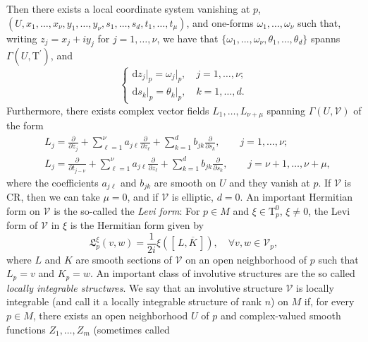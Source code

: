 \documentclass[11pt]{amsart}
\theoremstyle{definition}
\theoremstyle{remark}
\theoremstyle{plain}
\begin{document}
Then
there exists a local coordinate system vanishing at $p$,
$(U, x_1, \dots, x_\nu, y_1, \dots, y_\nu, s_1, \dots, s_d, t_1,
\dots, t_\mu)$, and one-forms
$\omega_1, \dots, \omega_\nu$ such that,
writing $z_j = x_j + iy_j$ for $j =1, \dots, \nu$, we have that
$\{\omega_1, \dots, \omega_\nu, \theta_1, \dots, \theta_d\}$ spanns
$\Gamma(U, \mathrm{T}^\prime)$, and
%
\begin{equation*}
  \begin{cases}
    \mathrm{d}z_j\big|_p = \omega_j \big|_p, \quad j = 1, \dots, \nu;\\
    \mathrm{d}s_k \big|_p = \theta_k\big|_p, \quad k = 1, \dots, d.
  \end{cases}
\end{equation*}
%
Furthermore, there exists complex vector fields
$L_1, \dots, L_{\nu + \mu}$ spanning $\Gamma(U, \mathcal{V})$ of the
form
%
\begin{align*}
  &L_{j} = \frac{\partial}{\partial \bar{z}_j} + \sum_{\ell = 1}^\nu a_{j\ell} \frac{\partial}{ \partial z_\ell} + \sum_{k =1}^d b_{jk}\frac{\partial}{\partial s_k}, \qquad j = 1, \dots, \nu;\\
  &L_{j} = \frac{\partial}{\partial t_{j-\nu}} + \sum_{\ell = 1}^\nu a_{j\ell} \frac{\partial}{ \partial z_\ell} + \sum_{k =1}^d b_{jk}\frac{\partial}{\partial s_k}, \qquad j = \nu+1, \dots, \nu+\mu,
\end{align*}
%
where the coefficients $a_{j\ell}$ and $b_{jk}$ are smooth on $U$ and
they vanish at $p$. If $\mathcal{V}$ is CR, then we can take
$\mu = 0$, and if $\mathcal{V}$ is elliptic, $d = 0$. An important
Hermitian form on $\mathcal{V}$ is the so-called the \emph{Levi form}:
For $p \in M$ and $\xi \in \mathrm{T}^0_p$, $\xi \neq 0$, the
Levi form of $\mathcal{V}$ in $\xi$ is the Hermitian form given by
%
\begin{equation*}
  \mathfrak{L}^\xi_p(v,w) =
  \frac{1}{2i}\xi   \left(\left[\,  L, \overline{K}\, \right]\right), \quad \forall v,w \in \mathcal{V}_p,
\end{equation*}
%
where $L$ and $K$ are smooth sections of $\mathcal{V}$ on an open
neighborhood of $p$ such that $L_p = v$ and $K_p = w$.
%
An important class of involutive structures are the so called
\emph{locally integrable structures}. We say that an involutive
structure $\mathcal{V}$ is locally integrable (and call it a locally
integrable structure of rank $n$) on $M$ if, for every
$p \in M$, there exists an open neighborhood $U$ of $p$ and
complex-valued smooth functions $Z_1, \dots, Z_m$ (sometimes called
\end{document}
